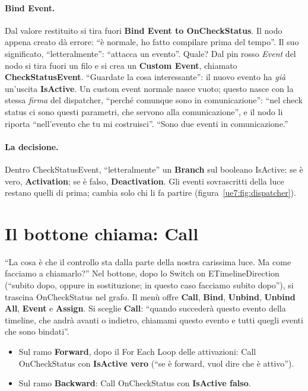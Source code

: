 \paragraph{Bind Event.} Dal valore restituito si tira fuori \textbf{Bind Event to
OnCheckStatus}. Il nodo appena creato dà errore: ``è normale, ho fatto compilare prima
del tempo''. Il suo significato, ``letteralmente'': ``attacca un evento''. Quale? Dal pin
rosso \emph{Event} del nodo si tira fuori un filo e si crea un \textbf{Custom Event},
chiamato \textbf{CheckStatusEvent}. ``Guardate la cosa interessante'': il nuovo evento ha
\emph{già} un'uscita \textbf{IsActive}. Un custom event normale nasce vuoto; questo nasce
con la stessa \emph{firma} del dispatcher, ``perché comunque sono in comunicazione'':
``nel check status ci sono questi parametri, che servono alla comunicazione'', e il nodo
li riporta ``nell'evento che tu mi costruisci''. ``Sono due eventi in comunicazione.''

\paragraph{La decisione.} Dentro CheckStatusEvent, ``letteralmente'' un \textbf{Branch}
sul booleano IsActive: se è vero, \textbf{Activation}; se è falso, \textbf{Deactivation}.
Gli eventi sovrascritti della luce restano quelli di prima; cambia solo chi li fa
partire (figura~\ref{ue7:fig:dispatcher}).

\section{Il bottone chiama: Call}
\label{ue7:sec:call}

``La cosa è che il controllo sta dalla parte della nostra carissima luce. Ma come
facciamo a chiamarlo?'' Nel bottone, dopo lo Switch on ETimelineDirection (``subito
dopo, oppure in sostituzione; in questo caso facciamo subito dopo''), si trascina
OnCheckStatus nel grafo. Il menù offre \textbf{Call}, \textbf{Bind}, \textbf{Unbind},
\textbf{Unbind All}, \textbf{Event} e \textbf{Assign}. Si sceglie \textbf{Call}:
``quando succederà questo evento della timeline, che andrà avanti o indietro, chiamami
questo evento e tutti quegli eventi che sono bindati''.
\begin{itemize}
  \item Sul ramo \textbf{Forward}, dopo il For Each Loop delle attivazioni: Call
        OnCheckStatus con \textbf{IsActive vero} (``se è forward, vuol dire che è
        attivo'').
  \item Sul ramo \textbf{Backward}: Call OnCheckStatus con \textbf{IsActive falso}.
\end{itemize}

